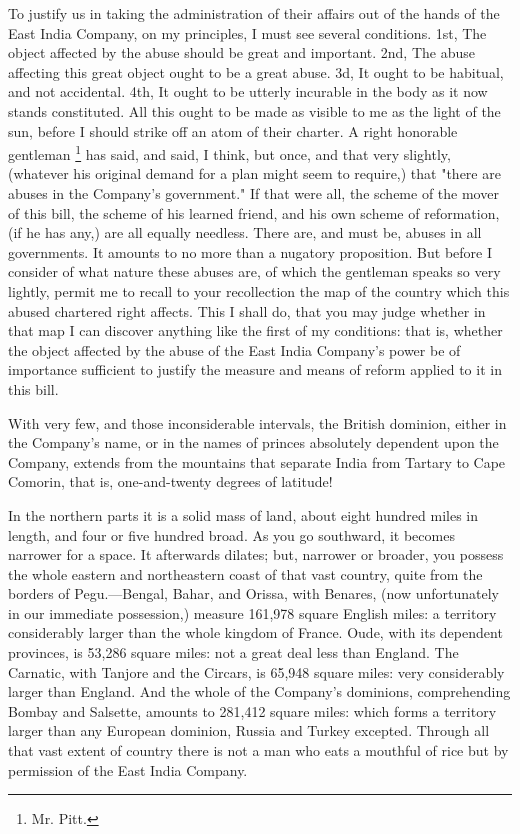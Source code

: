 To justify us in taking the administration of their affairs out of the hands of the East India Company, on my principles, I must see several conditions. 1st, The object affected by the abuse should be great and important. 2nd, The abuse affecting this great object ought to be a great abuse. 3d, It ought to be habitual, and not accidental. 4th, It ought to be utterly incurable in the body as it now stands constituted. All this ought to be made as visible to me as the light of the sun, before I should strike off an atom of their charter. A right honorable gentleman
\footnote{ Mr. Pitt.}
 has said, and said, I think, but once, and that very slightly, (whatever his original demand for a plan might seem to require,) that "there are abuses in the Company's government." If that were all, the scheme of the mover of this bill, the scheme of his learned friend, and his own scheme of reformation, (if he has any,) are all equally needless. There are, and must be, abuses in all governments. It amounts to no more than a nugatory proposition. But before I consider of what nature these abuses are, of which the gentleman speaks so very lightly, permit me to recall to your recollection the map of the country which this abused chartered right affects. This I shall do, that you may judge whether in that map I can discover anything like the first of my conditions: that is, whether the object affected by the abuse of the East India Company's power be of importance sufficient to justify the measure and means of reform applied to it in this bill.

With very few, and those inconsiderable intervals, the British dominion, either in the Company's name, or in the names of princes absolutely dependent upon the Company, extends from the mountains that separate India from Tartary to Cape Comorin, that is, one-and-twenty degrees of latitude!

In the northern parts it is a solid mass of land, about eight hundred miles in length, and four or five hundred broad. As you go southward, it becomes narrower for a space. It afterwards dilates; but, narrower or broader, you possess the whole eastern and northeastern coast of that vast country, quite from the borders of Pegu.—Bengal, Bahar, and Orissa, with Benares, (now unfortunately in our immediate possession,) measure 161,978 square English miles: a territory considerably larger than the whole kingdom of France. Oude, with its dependent provinces, is 53,286 square miles: not a great deal less than England. The Carnatic, with Tanjore and the Circars, is 65,948 square miles: very considerably larger than England. And the whole of the Company's dominions, comprehending Bombay and Salsette, amounts to 281,412 square miles: which forms a territory larger than any European dominion, Russia and Turkey excepted. Through all that vast extent of country there is not a man who eats a mouthful of rice but by permission of the East India Company.

